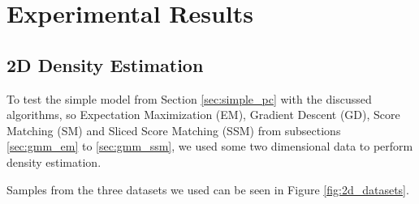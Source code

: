 \renewcommand{\vec}[1]{\textbf{#1}}

\chapter{Experimental Results}
\label{cha:experimental_results}

\section{2D Density Estimation}

To test the simple model from Section \ref{sec:simple_pc} with the discussed algorithms, so Expectation Maximization (EM), 
Gradient Descent (GD), Score Matching (SM) and Sliced Score Matching (SSM) from subsections \ref{sec:gmm_em} to \ref{sec:gmm_ssm}, we used some 
two dimensional data to perform density estimation. 

Samples from the three datasets we used can be seen in Figure \ref{fig:2d_datasets}. \\

